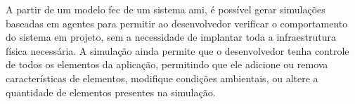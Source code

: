     A partir de um modelo \acrshort{fec} de um sistema \acrshort{ami}, é possível gerar simulações baseadas em agentes para permitir ao desenvolvedor verificar o comportamento do sistema em projeto, sem a necessidade de implantar toda a infraestrutura física necessária. A simulação ainda permite que o desenvolvedor tenha controle de todos os elementos da aplicação, permitindo que ele adicione ou remova características de elementos, modifique condições ambientais, ou altere a quantidade de elementos presentes na simulação.
    
    
    
    
    
    
